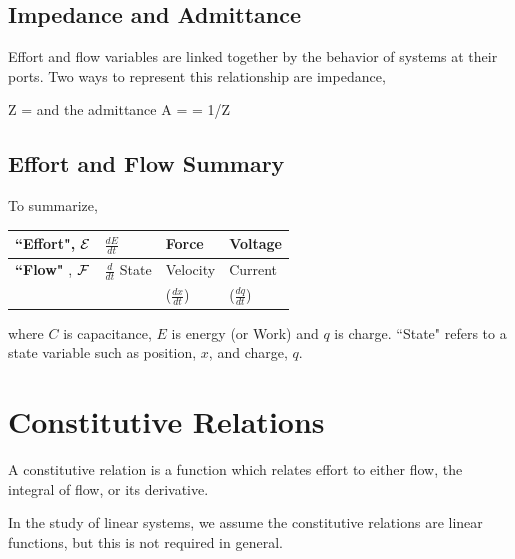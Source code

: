 \subsection{Impedance and Admittance}
Effort and flow variables are linked together by the behavior of systems at their ports.  Two ways to represent this relationship are impedance,

\bq
Z = 
\eq
and the admittance
\bq
A =  = 1/Z
\eq





\subsection{Effort and Flow Summary}
To summarize,	%

\begin{center}
\begin{tabular}{l|l|l|l}
\hline
{\bf ``Effort"}, $\mathcal{E}$  &  $\frac{dE}{dt}$         & Force              & Voltage     \\
\hline
{\bf ``Flow" },  $\mathcal{F}$  &  $\frac{d}{dt}$ State    & Velocity           & Current     \\
                     &                           & ($\frac{dx}{dt}$)    & ($\frac{dq}{dt}$) \\
\hline
\end{tabular}
\end{center}

where $C$ is capacitance, $E$ is energy (or Work) and $q$ is charge. ``State" refers to a state variable such as position, $x$, and charge, $q$.




\section{Constitutive Relations}
A constitutive relation is a function which relates effort to either flow, the integral of flow, or its derivative.

 In the study of linear systems, we assume the constitutive relations are linear functions, but this is not required in general.	%

